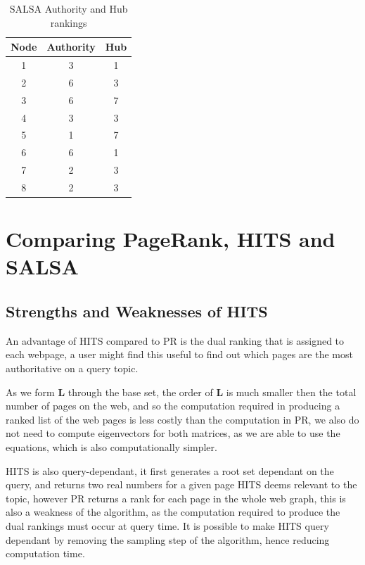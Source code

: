 \documentclass[11pt]{report}
\begin{document}
\begin{table}[h] \caption{SALSA Authority and Hub rankings}
 \centering
 \begin{tabular} {c| c c} 
 Node & Authority & Hub \\ [0.5ex] 
 \hline
 1&3&1\\
 2&6&3\\
 3&6&7\\
 4&3&3\\
 5&1&7\\
 6&6&1\\
 7&2&3\\
 8&2&3\\
 \end{tabular}
 \label{Table:SALSA}
\end{table}



\section{Comparing PageRank, HITS and SALSA} \label{sec:compare}

\subsection{Strengths and Weaknesses of HITS} \label{sec:HITS adv and dis}

An advantage of HITS compared to PR is the dual ranking that is assigned to each webpage, a user might find this useful to find out which pages are the most authoritative on a query topic. 

As we form \textbf{L} through the base set, the order of \textbf{L} is much smaller then the total number of pages on the web, and so the computation required in producing a ranked list of the web pages is less costly than the computation in PR, we also do not need to compute eigenvectors for both matrices, as we are able to use the equations, which is also computationally simpler. 

HITS is also query-dependant, it first generates a root set dependant on the query, and returns two real numbers for a given page HITS deems relevant to the topic, however PR returns a rank for each page in the whole web graph, this is also a weakness of the algorithm, as the computation required to produce the dual rankings must occur at query time. It is possible to make HITS query dependant by removing the sampling step of the algorithm, hence reducing computation time. 
\end{document}
